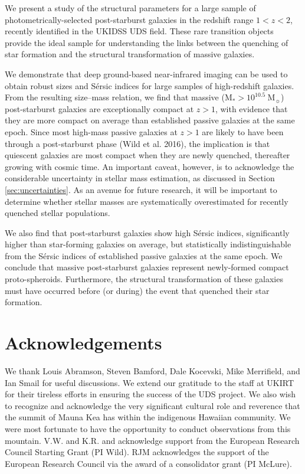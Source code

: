 \documentclass[a4paper,fleqn,usenatbib,useAMS]{mnras}
\begin{document}
\smallskip

We present a study of the structural parameters for a large sample of
photometrically-selected post-starburst galaxies in the redshift range
$1<z<2$, recently identified in the UKIDSS UDS field. These rare
transition objects provide the ideal sample for understanding the
links between the quenching of star formation and the structural
transformation of massive galaxies.

We demonstrate that deep ground-based near-infrared imaging can be
used to obtain robust sizes and S\'{e}rsic indices for large samples
of high-redshift galaxies.  From the resulting size--mass relation, we
find that massive (M$_{\ast}> 10^{10.5} ~$M$_{\sun}$) post-starburst
galaxies are exceptionally compact at $z>1$, with evidence that they
are more compact on average than established passive galaxies at the
same epoch.  Since most high-mass passive galaxies at $z>1$ are likely
to have been through a post-starburst phase (Wild et al. 2016), the
implication is that quiescent galaxies are most compact when they are
newly quenched, thereafter growing with cosmic time.  An important
caveat, however, is to acknowledge the considerable uncertainty in
stellar mass estimation, as discussed in Section
\ref{sec:uncertainties}. As an avenue for future research, it will be
important to determine whether stellar masses are systematically
overestimated for recently quenched stellar populations.



We also find that post-starburst galaxies show high S\'{e}rsic
indices, significantly higher than star-forming galaxies on average,
but statistically indistinguishable from the S\'{e}rsic indices of
established passive galaxies at the same epoch. We conclude that
massive post-starburst galaxies represent newly-formed compact
proto-spheroids.  Furthermore, the structural transformation of these
galaxies must have occurred before (or during) the event that quenched
their star formation.





\section*{Acknowledgements}

We thank Louis Abramson, Steven Bamford, Dale Kocevski, Mike Merrifield, and Ian Smail
for useful discussions.  We extend our gratitude to the staff at UKIRT
for their tireless efforts in ensuring the success of the UDS project.
We also wish to recognize and acknowledge the very significant
cultural role and reverence that the summit of Mauna Kea has within
the indigenous Hawaiian community.  We were most fortunate to have the
opportunity to conduct observations from this mountain.  V.W. and
K.R. and acknowledge support from the European Research Council
Starting Grant (PI Wild).  RJM acknowledges the support of the
European Research Council via the award of a consolidator grant (PI
McLure).
\end{document}
